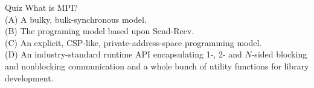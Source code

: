 \documentclass[11pt]{beamer}
\begin{document}
\begin{frame}{Quiz}
    What is MPI? \\
    (A) A bulky, bulk-synchronous model. \\
    (B) The programing model based upon Send-Recv. \\
    (C) An explicit, CSP-like, private-address-space programming model. \\
    (D) An industry-standard runtime API encapsulating
        1-, 2- and $N$-sided blocking and nonblocking communication
        and a whole bunch of utility functions for library development. 

\end{frame}
\end{document}

